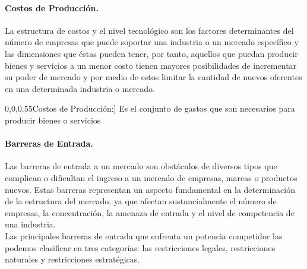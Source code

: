 \paragraph{{\normalsize Costos de Producción.}}
La estructura de costos y el nivel tecnológico son los factores determinantes del número de empresas que puede soportar una
industria o un mercado específico y las dimensiones que éstas pueden tener, por tanto, aquellos que puedan producir bienes y servicios a un menor costo tienen mayores posibilidades de incrementar su poder de mercado y por medio de estos limitar la cantidad de nuevos oferentes en una determinada industria o mercado. 

\begin{definicion}[\textcolor[rgb]{0,0,0.55}{Costos de Producción:}]
	Es el conjunto de gastos que son necesarios para producir bienes o servicios
\end{definicion}

\paragraph{{\normalsize Barreras de Entrada.}}
Las barreras de entrada a un mercado son obstáculos de diversos tipos que complican o dificultan el ingreso a un mercado de empresas, marcas o productos nuevos. Estas barreras representan un aspecto fundamental en la determinación de la estructura del mercado, ya que afectan sustancialmente el número de empresas, la concentración, la amenaza de entrada y el nivel de competencia de una industria. \\

Las principales barreras de entrada que enfrenta un potencia competidor las podemos clasificar en tres categorías: las restricciones legales, restricciones naturales y restricciones estratégicas.

